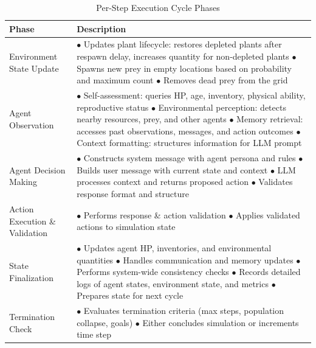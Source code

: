 




\begin{table}[htbp]
  \centering
  \caption{Per-Step Execution Cycle Phases}
  \label{tab:execution_cycle}
  \small
  \setlength{\tabcolsep}{5pt}
  \begin{tabular}{p{2.5cm}p{10cm}}
    \toprule
    \textbf{Phase} & \textbf{Description} \\
    \midrule
    Environment State Update & 
    $\bullet$ Updates plant lifecycle: restores depleted plants after respawn delay, increases quantity for non-depleted plants \newline
    $\bullet$ Spawns new prey in empty locations based on probability and maximum count \newline
    $\bullet$ Removes dead prey from the grid \\
    \midrule
    Agent Observation & 
    $\bullet$ Self-assessment: queries HP, age, inventory, physical ability, reproductive status \newline
    $\bullet$ Environmental perception: detects nearby resources, prey, and other agents \newline
    $\bullet$ Memory retrieval: accesses past observations, messages, and action outcomes \newline
    $\bullet$ Context formatting: structures information for LLM prompt \\
    \midrule
    Agent Decision Making & 
    $\bullet$ Constructs system message with agent persona and rules \newline
    $\bullet$ Builds user message with current state and context \newline
    $\bullet$ LLM processes context and returns proposed action \newline
    $\bullet$ Validates response format and structure \\
    \midrule
    Action Execution \& Validation & 
    $\bullet$ Performs response \& action validation \newline
    $\bullet$ Applies validated actions to simulation state \\
    \midrule
    State Finalization &
    $\bullet$ Updates agent HP, inventories, and environmental quantities \newline
    $\bullet$ Handles communication and memory updates \newline
    $\bullet$ Performs system-wide consistency checks \newline
    $\bullet$ Records detailed logs of agent states, environment state, and metrics \newline
    $\bullet$ Prepares state for next cycle \\
    \midrule
    Termination Check & 
    $\bullet$ Evaluates termination criteria (max steps, population collapse, goals) \newline
    $\bullet$ Either concludes simulation or increments time step \\
    \bottomrule
  \end{tabular}
\end{table}





